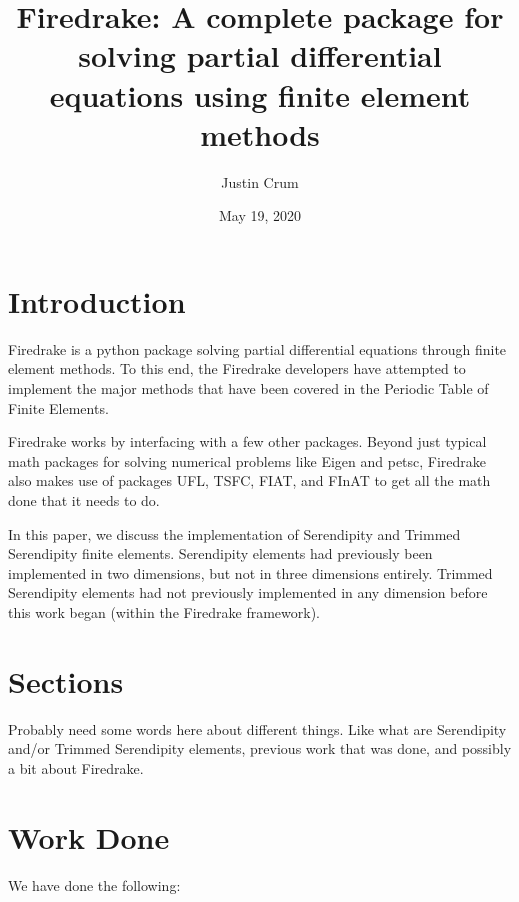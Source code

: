 \documentclass[12pt]{extarticle}
\title{Firedrake:  A complete package for solving partial differential equations using finite element methods}
\author{Justin Crum}
\date{May 19, 2020}
\newcommand{\<}{\langle}
\renewcommand{\>}{\rangle}
\theoremstyle{definition}
\begin{document}
\maketitle

\section{Introduction}

Firedrake is a python package solving partial differential equations through finite element methods.  To this end, the Firedrake developers have attempted to implement the major methods that have been covered in the Periodic Table of Finite Elements.

Firedrake works by interfacing with a few other packages.  Beyond just typical math packages for solving numerical problems like Eigen and petsc, Firedrake also makes use of packages UFL, TSFC, FIAT, and FInAT to get all the math done that it needs to do.

In this paper, we discuss the implementation of Serendipity and Trimmed Serendipity finite elements.  Serendipity elements had previously been implemented in two dimensions, but not in three dimensions entirely.  Trimmed Serendipity elements had not previously implemented in any dimension before this work began (within the Firedrake framework).

\section{Sections}

Probably need some words here about different things.  Like what are Serendipity and/or Trimmed Serendipity elements, previous work that was done, and possibly a bit about Firedrake.

\section{Work Done}

We have done the following:
\end{document}
